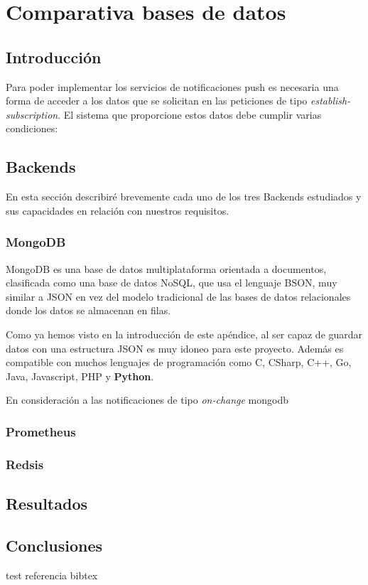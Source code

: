 \chapter{Comparativa bases de datos\label{sec:ejemplos}}
\section{Introducción}
Para poder implementar los servicios de notificaciones push es necesaria una forma de acceder a los datos que se solicitan en las peticiones de tipo \textit{establish-subscription}. El sistema que proporcione estos datos debe cumplir varias condiciones:



\section{Backends}
En esta sección describiré brevemente cada uno de los tres Backends estudiados y sus capacidades en relación con nuestros requisitos.
\subsection{MongoDB}
MongoDB es una base de datos multiplataforma orientada a documentos, clasificada como una base de datos NoSQL, que usa el lenguaje BSON, muy similar a JSON en vez del modelo tradicional de las bases de datos relacionales donde los datos se almacenan en filas. 

Como ya hemos visto en la introducción de este apéndice, al ser capaz de guardar datos con una estructura JSON es muy idoneo para este proyecto. Además es compatible con muchos lenguajes de programación como C, CSharp, C++, Go, Java, Javascript, PHP y \textbf{Python}.

En consideración a las notificaciones de tipo \textit{on-change} mongodb


\subsection{Prometheus}
\subsection{Redsis}
\section{Resultados}
\section{Conclusiones}

\cite{knuth:1984} test referencia bibtex
\cite{ipv4sta}